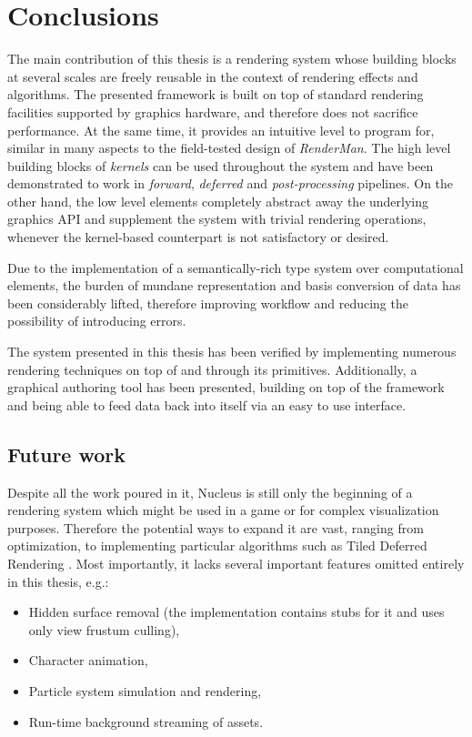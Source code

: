 
\chapter{ Conclusions }
\label{Chapter7}

The main contribution of this thesis is a rendering system whose building blocks at several scales are freely reusable in the context of rendering effects and algorithms. The presented framework is built on top of standard rendering facilities supported by graphics hardware, and therefore does not sacrifice performance. At the same time, it provides an intuitive level to program for, similar in many aspects to the field-tested design of \emph{RenderMan}. The high level building blocks of \emph{kernels} can be used throughout the system and have been demonstrated to work in \emph{forward}, \emph{deferred} and \emph{post-processing} pipelines. On the other hand, the low level elements completely abstract away the underlying graphics API and supplement the system with trivial rendering operations, whenever the kernel-based counterpart is not satisfactory or desired.

Due to the implementation of a semantically-rich type system over computational elements, the burden of mundane representation and basis conversion of data has been considerably lifted, therefore improving workflow and reducing the possibility of introducing errors.

The system presented in this thesis has been verified by implementing numerous rendering techniques on top of and through its primitives. Additionally, a graphical authoring tool has been presented, building on top of the framework and being able to feed data back into itself via an easy to use interface.

\section{Future work}

Despite all the work poured in it, Nucleus is still only the beginning of a rendering system which might be used in a game or for complex visualization purposes. Therefore the potential ways to expand it are vast, ranging from optimization, to implementing particular algorithms such as Tiled Deferred Rendering \cite{tiledDeferred}. Most importantly, it lacks several important features omitted entirely in this thesis, e.g.:
\begin{itemize}
\item Hidden surface removal (the implementation contains stubs for it and uses only view frustum culling),
\item Character animation,
\item Particle system simulation and rendering,
\item Run-time background streaming of assets.
\end{itemize}

